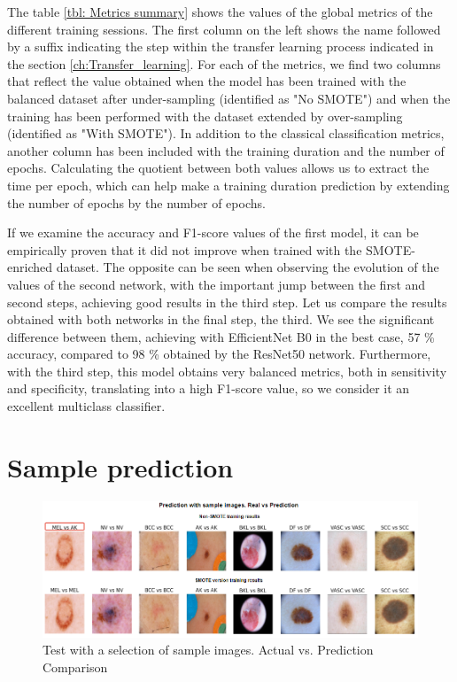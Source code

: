 The table \ref{tbl: Metrics summary} shows the values of the global metrics of the different training sessions. The first column on the left shows the name followed by a suffix indicating the step within the transfer learning process indicated in the section \ref{ch:Transfer_learning}. For each of the metrics, we find two columns that reflect the value obtained when the model has been trained with the balanced dataset after under-sampling (identified as "No SMOTE") and when the training has been performed with the dataset extended by over-sampling (identified as "With SMOTE"). In addition to the classical classification metrics, another column has been included with the training duration and the number of epochs. Calculating the quotient between both values allows us to extract the time per epoch, which can help make a training duration prediction by extending the number of epochs by the number of epochs. 

If we examine the accuracy and F1-score values of the first model, it can be empirically proven that it did not improve when trained with the SMOTE-enriched dataset. The opposite can be seen when observing the evolution of the values of the second network, with the important jump between the first and second steps, achieving good results in the third step. Let us compare the results obtained with both networks in the final step, the third. We see the significant difference between them, achieving with EfficientNet B0 in the best case, 57 \% accuracy, compared to 98 \% obtained by the ResNet50 network. Furthermore, with the third step, this model obtains very balanced metrics, both in sensitivity and specificity, translating into a high F1-score value, so we consider it an excellent multiclass classifier.

\section{Sample prediction}

\begin{figure}[ht]
    \centering
        \includegraphics[scale=0.60]{images/Conclusion/Sample images Real vs Prediction.png}
        \caption{Test with a selection of sample images. Actual vs. Prediction Comparison}
    \label{fig: Sample Images real vs prediction}
\end{figure}

